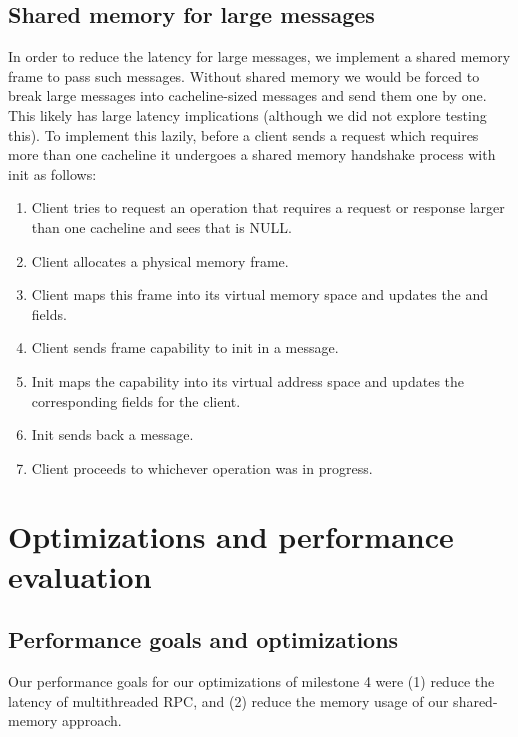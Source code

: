 \subsection{Shared memory for large messages}
\label{sec:shared_mem}
In order to reduce the latency for large messages, we implement a shared memory frame to pass such messages. Without shared memory
 we would be forced to break large messages into cacheline-sized messages and send them one by one. This likely has large
 latency implications (although we did not explore testing this). To implement this lazily, before a client sends a request which
 requires more than one cacheline it undergoes a shared memory handshake process with init as follows:
 \begin{enumerate}
    \item Client tries to request an operation that requires a request or response larger than one cacheline and sees that  is NULL.
    \item Client allocates a physical memory frame.
    \item Client maps this frame into its virtual memory space and updates the \newline {} and  fields.
    \item Client sends frame capability to init in a  message.
    \item Init maps the capability into its virtual address space and updates the corresponding  fields for the client.
    \item Init sends back a  message.
    \item Client proceeds to whichever operation was in progress.
 \end{enumerate}

\section{Optimizations and performance evaluation}

\subsection{Performance goals and optimizations}
Our performance goals for our optimizations of milestone 4 were (1) reduce the latency of multithreaded RPC, 
and (2) reduce the memory usage of our shared-memory approach.
